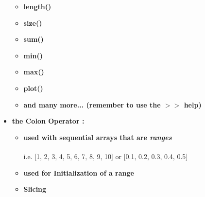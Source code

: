 \documentclass[11pt]{article}
\begin{document}
\begin{itemize}
		
		\begin{itemize}
			\item \textbf{ \Large \color{black} length()} \\  \vspace{15mm}
            		\item \textbf{ \Large \color{black} size()} \\  \vspace{15mm}
            		\item \textbf{ \Large \color{black} sum()} \\  \vspace{15mm}
            		\item \textbf{ \Large \color{black} min()} \\  \vspace{15mm}	
            		\item \textbf{ \Large \color{black} max()} \\  \vspace{15mm}
            		\item \textbf{ \Large \color{black} plot()} \\  \vspace{15mm}		
            		\item \textbf{ \Large \color{black} and many more... (remember to use the $>>$ help)} \\  \vspace{15mm}	
		\end{itemize}

\newpage
		\item \textbf{ \LARGE the \color{mypurple}Colon Operator :\color{black}}\\
	
		\Large
		\begin{itemize}
			\item \textbf{ used with sequential arrays that are {\it ranges}} \\\\ i.e. [1, 2, 3, 4, 5, 6, 7, 8, 9, 10] or [0.1, 0.2, 0.3, 0.4, 0.5] \vspace{25mm} 
			
			\item \textbf{ \Large used for Initialization of a range} \\  \vspace{25mm}
			
			\item \textbf{ \Large Slicing} \\  \vspace{15mm}
		\end{itemize}


\end{itemize}
\end{document}

